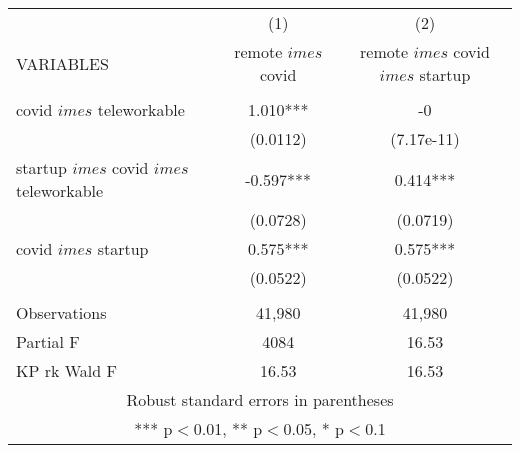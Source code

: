 \begin{tabular}{lcc} \hline
 & (1) & (2) \\
VARIABLES & remote $	imes$ covid & remote $	imes$ covid $	imes$ startup \\ \hline
 &  &  \\
covid $	imes$ teleworkable & 1.010*** & -0 \\
 & (0.0112) & (7.17e-11) \\
startup $	imes$ covid $	imes$ teleworkable & -0.597*** & 0.414*** \\
 & (0.0728) & (0.0719) \\
covid $	imes$ startup & 0.575*** & 0.575*** \\
 & (0.0522) & (0.0522) \\
 &  &  \\
Observations & 41,980 & 41,980 \\
Partial F & 4084 & 16.53 \\
 KP rk Wald F & 16.53 & 16.53 \\ \hline
\multicolumn{3}{c}{ Robust standard errors in parentheses} \\
\multicolumn{3}{c}{ *** p$<$0.01, ** p$<$0.05, * p$<$0.1} \\
\end{tabular}

